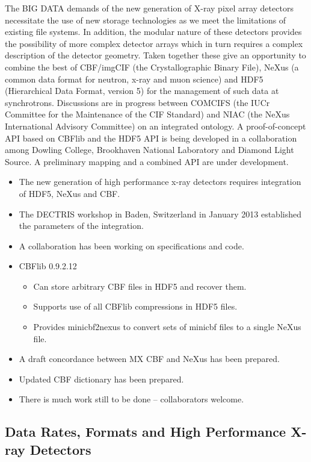 \documentclass[11pt]{a0poster}
\begin{document}
\begin{minipage}[]{0.29\linewidth}
\fontsize{18}{22}\selectfont%
The BIG DATA demands of the new generation of X-ray pixel array
detectors necessitate the use of new storage technologies as we meet
the limitations of existing file systems. In addition, the modular
nature of these detectors provides the possibility of more complex
detector arrays which in turn requires a complex
description of the detector geometry. Taken together these give an
opportunity to combine the best of CBF/imgCIF (the Crystallographic
Binary File), NeXus (a common data format for neutron, x-ray and muon
science) and HDF5 (Hierarchical Data Format, version 5) for the
management of such data at synchrotrons. Discussions are in progress
between COMCIFS (the IUCr Committee for the Maintenance of the CIF
Standard) and NIAC (the NeXus International Advisory Committee) on an
integrated ontology. A proof-of-concept API based on CBFlib and the
HDF5 API is being developed in a collaboration among Dowling College,
Brookhaven National Laboratory and Diamond Light Source. A preliminary
mapping and a combined API are under development.
\begin{itemize}
\item{The new generation of high performance x-ray detectors requires
    integration of HDF5, NeXus and CBF.}
\item{The DECTRIS workshop in Baden, Switzerland in January 2013
    established the parameters of the integration.} 
\item{A collaboration has been working on specifications and code.}
\item{CBFlib 0.9.2.12
\begin{itemize}
\item{Can store arbitrary CBF files in HDF5 and recover them.}
\item{Supports use of all CBFlib compressions in HDF5 files.}
\item{Provides minicbf2nexus to convert sets of minicbf files to a single NeXus file.}
\end{itemize}}
\item{A draft concordance between MX CBF and NeXus has been prepared.}
\item{Updated CBF dictionary has been prepared.}
\item{There is much work still to be done -- collaborators welcome.}
\end{itemize}
\vspace{-8mm}%

\subsection*{Data Rates, Formats and High Performance X-ray Detectors}


\end{minipage}
\end{document}
